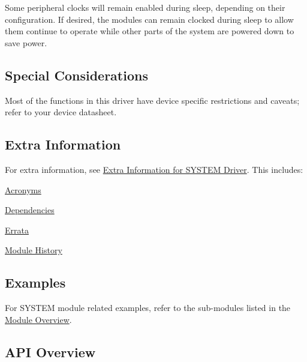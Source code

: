 Some peripheral clocks will remain enabled during sleep, depending on their configuration. If desired, the modules can remain clocked during sleep to allow them continue to operate while other parts of the system are powered down to save power.\hypertarget{group__asfdoc__sam0__system__group_asfdoc_sam0_system_special_considerations}{}\subsection{Special Considerations}\label{group__asfdoc__sam0__system__group_asfdoc_sam0_system_special_considerations}
Most of the functions in this driver have device specific restrictions and caveats; refer to your device datasheet.\hypertarget{group__asfdoc__sam0__system__group_asfdoc_sam0_system_extra_info}{}\subsection{Extra Information}\label{group__asfdoc__sam0__system__group_asfdoc_sam0_system_extra_info}
For extra information, see \hyperlink{asfdoc_sam0_system_extra}{Extra Information for S\+Y\+S\+T\+E\+M Driver}. This includes\+:
\begin{DoxyItemize}
\item \hyperlink{asfdoc_sam0_system_extra_asfdoc_sam0_system_extra_acronyms}{Acronyms}
\item \hyperlink{asfdoc_sam0_system_extra_asfdoc_sam0_system_extra_dependencies}{Dependencies}
\item \hyperlink{asfdoc_sam0_system_extra_asfdoc_sam0_system_extra_errata}{Errata}
\item \hyperlink{asfdoc_sam0_system_extra_asfdoc_sam0_system_extra_history}{Module History}
\end{DoxyItemize}\hypertarget{group__asfdoc__sam0__system__group_asfdoc_sam0_system_examples}{}\subsection{Examples}\label{group__asfdoc__sam0__system__group_asfdoc_sam0_system_examples}
For S\+Y\+S\+T\+E\+M module related examples, refer to the sub-\/modules listed in the \hyperlink{group__asfdoc__sam0__system__group_asfdoc_sam0_system_module_overview}{Module Overview}.\hypertarget{group__asfdoc__sam0__system__group_asfdoc_sam0_system_api_overview}{}\subsection{A\+P\+I Overview}\label{group__asfdoc__sam0__system__group_asfdoc_sam0_system_api_overview}



